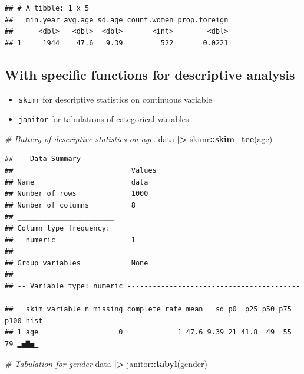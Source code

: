 \documentclass[
]{book}
\newenvironment{Shaded}{\begin{snugshade}}{\end{snugshade}}
\newcommand{\CommentTok}[1]{\textcolor[rgb]{0.56,0.35,0.01}{\textit{#1}}}
\newcommand{\FunctionTok}[1]{\textcolor[rgb]{0.13,0.29,0.53}{\textbf{#1}}}
\newcommand{\NormalTok}[1]{#1}
\newcommand{\SpecialCharTok}[1]{\textcolor[rgb]{0.81,0.36,0.00}{\textbf{#1}}}
\providecommand{\tightlist}{%
  \setlength{\itemsep}{0pt}\setlength{\parskip}{0pt}}
\begin{document}
\begin{verbatim}
## # A tibble: 1 x 5
##   min.year avg.age sd.age count.women prop.foreign
##      <dbl>   <dbl>  <dbl>       <int>        <dbl>
## 1     1944    47.6   9.39         522       0.0221
\end{verbatim}

\hypertarget{with-specific-functions-for-descriptive-analysis}{%
\subsection{With specific functions for descriptive analysis}\label{with-specific-functions-for-descriptive-analysis}}

\begin{itemize}
\tightlist
\item
  \texttt{skimr} for descriptive statistics on continuous variable
\item
  \texttt{janitor} for tabulations of categorical variables.
\end{itemize}

\begin{Shaded}
\begin{Highlighting}[]
\CommentTok{\# Battery of descriptive statistics on age.}
\NormalTok{data }\SpecialCharTok{|\textgreater{}} 
\NormalTok{  skimr}\SpecialCharTok{::}\FunctionTok{skim\_tee}\NormalTok{(age)}
\end{Highlighting}
\end{Shaded}

\begin{verbatim}
## -- Data Summary ------------------------
##                            Values
## Name                       data  
## Number of rows             1000  
## Number of columns          8     
## _______________________          
## Column type frequency:           
##   numeric                  1     
## ________________________         
## Group variables            None  
## 
## -- Variable type: numeric ------------------------------------------------------
##   skim_variable n_missing complete_rate mean   sd p0  p25 p50 p75 p100 hist 
## 1 age                   0             1 47.6 9.39 21 41.8  49  55   79 ▂▅▇▅▁
\end{verbatim}

\begin{Shaded}
\begin{Highlighting}[]
\CommentTok{\# Tabulation for gender}
\NormalTok{data }\SpecialCharTok{|\textgreater{}} 
\NormalTok{  janitor}\SpecialCharTok{::}\FunctionTok{tabyl}\NormalTok{(gender)}
\end{Highlighting}
\end{Shaded}
\end{document}
